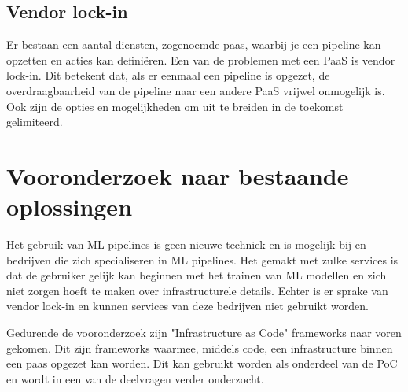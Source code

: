 \subsection{Vendor lock-in}\label{subsec:ch2-vendor-lock-in}
Er bestaan een aantal diensten, zogenoemde \acrfull{paas}, waarbij je een pipeline kan opzetten en acties kan definiëren. Een van de problemen met een PaaS is vendor lock-in. Dit betekent dat, als er eenmaal een pipeline is opgezet, de overdraagbaarheid van de pipeline naar een andere PaaS vrijwel onmogelijk is. Ook zijn de opties en mogelijkheden om uit te breiden in de toekomst gelimiteerd. 

\section{Vooronderzoek naar bestaande oplossingen}\label{sec:ch2-vooronderzoek-naar-bestaande-oplossingen}
Het gebruik van ML pipelines is geen nieuwe techniek en is mogelijk bij  en bedrijven die zich specialiseren in ML pipelines. Het gemakt met zulke services is dat de gebruiker gelijk kan beginnen met het trainen van ML modellen en zich niet zorgen hoeft te maken over infrastructurele details. Echter is er sprake van vendor lock-in en kunnen services van deze bedrijven niet gebruikt worden.

Gedurende de vooronderzoek zijn "Infrastructure as Code" frameworks naar voren gekomen. Dit zijn frameworks waarmee, middels code, een infrastructure binnen een \gls{paas} opgezet kan worden. Dit kan gebruikt worden als onderdeel van de PoC en wordt in een van de deelvragen verder onderzocht.


